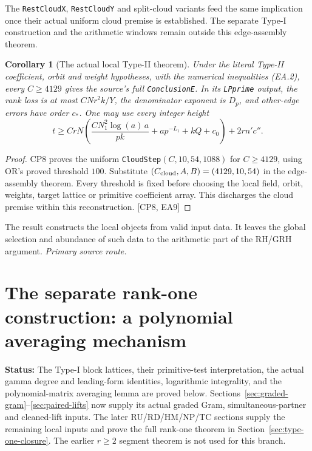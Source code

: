 \documentclass[11pt,a4paper]{article}
\numberwithin{equation}{section}
\newtheorem{corollary}[theorem]{Corollary}
\theoremstyle{remark}\newtheorem{remark}[theorem]{Remark}
\newcommand{\status}[1]{\textbf{Status:} #1}
\begin{document}
The \texttt{RestCloudX}, \texttt{RestCloudY} and split-cloud variants feed
the same implication once their actual uniform cloud premise is established.
The separate Type-I construction and the arithmetic windows remain outside
this edge-assembly theorem.

\begin{corollary}[The actual local Type-II theorem]\label{cor:typeII}
Under the literal Type-II coefficient, orbit and weight hypotheses,
with the numerical inequalities (EA.2), every $C\ge4129$ gives the
source's full \texttt{ConclusionE}. In its \texttt{LPprime} output,
the rank loss is at most $CNr^2k/Y$, the denominator exponent is $D_p$,
and other-edge errors have order $c_*$. One may use every integer height
\[
 t\ge CrN\left(\frac{CN_1^2\log(a)\,a}{pk}
                  +ap^{-L_1}+kQ+c_0\right)+2rn'c''.
\]
\end{corollary}
\begin{proof}
CP8 proves the uniform \texttt{CloudStep}$(C,10,54,1088)$ for
$C\ge4129$, using OR's proved threshold $100$. Substitute
$(C_{\rm cloud},A,B)=(4129,10,54)$ in the edge-assembly theorem.
Every threshold is fixed before choosing the local field, orbit, weights,
target lattice or primitive coefficient array. This discharges the
cloud premise within this reconstruction. \textsf{[CP8, EA9]}
\end{proof}
The result constructs the local objects from valid input data. It leaves
the global selection and abundance of such data to the arithmetic part
of the RH/GRH argument.
\noindent\textit{Primary source route.}\cite{edges-actual}


\section{The separate rank-one construction: a polynomial averaging mechanism}
\label{sec:type-one}

\status{The Type-I block lattices, their primitive-test interpretation, the
actual gamma degree and leading-form identities, logarithmic integrality,
and the polynomial-matrix averaging lemma are proved below.
Sections~\ref{sec:graded-gram}--\ref{sec:paired-lifts} now supply its
actual graded Gram, simultaneous-partner and cleaned-lift inputs.
The later RU/RD/HM/NP/TC sections supply the remaining local inputs and prove the full rank-one theorem in Section~\ref{sec:type-one-closure}.
The earlier $r\geq2$ segment theorem is not used for this branch.}
\end{document}
